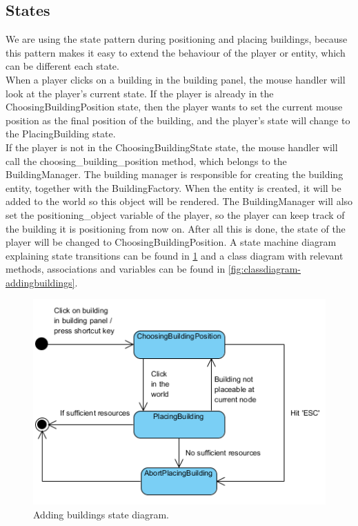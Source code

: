 \subsection{States} 
We are using the state pattern during positioning and placing buildings, 
because this pattern makes it easy to extend the behaviour of the player or 
entity, which can be different each state.\\ 
When a player clicks on a building in the building panel, the mouse handler 
will look at the player's current state. If the player is already in the
ChoosingBuildingPosition state, then the player wants to set the current mouse
position as the final position of the building, and the player's state will
change to the  PlacingBuilding state.\\ 
If the player is not in the ChoosingBuildingState state, the mouse  handler 
will call the choosing\_building\_position method, which belongs to the 
BuildingManager. The building manager is responsible for creating the 
building entity, together with the BuildingFactory.  When the entity is 
created, it will be added to the world so this object will be rendered.  
The BuildingManager will also set the positioning\_object variable of the 
player, so the player can keep track of the building it is positioning from 
now on. After all this is done, the state of the player will be changed to 
ChoosingBuildingPosition.  A state machine diagram explaining state 
transitions can be found in \cref{fig:statediagram-addingbuildings} and a 
class diagram with relevant methods, associations and variables can be found in
\cref{fig:classdiagram-addingbuildings}.

\begin{figure}[H] 
    \centering
    \includegraphics{res/adding-buildings/States-StateDiagram.png} 
    \caption{Adding buildings state diagram.}\label{fig:statediagram-addingbuildings} 
\end{figure}

